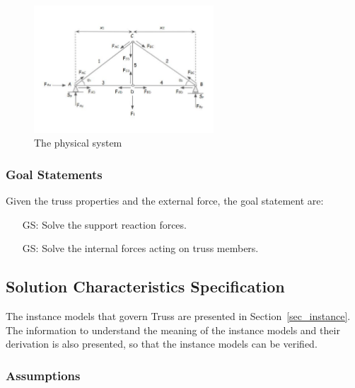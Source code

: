 \documentclass[12pt]{article}
\newcounter{goalnum} %
\begin{document}
\begin{figure}[h!]
	\begin{center}
		\includegraphics[width=0.6\textwidth]{PhysicalSystem}
		\caption{The physical system}
		\label{Fig_PhysicalSystem} 
	\end{center}
\end{figure}

\subsubsection{Goal Statements}\label{sec_goal}

\noindent 
Given the truss properties and the external force, the goal statement are:

\begin{itemize}
\item[GS\refstepcounter{goalnum}\thegoalnum \label{G_solreactforce}:] 
{Solve the support reaction forces.}

\item[GS\refstepcounter{goalnum}\thegoalnum \label{G_solforce}:] 
{Solve the internal forces acting on truss members.}
\end{itemize}

\subsection{Solution Characteristics Specification} \label{Sec_solcharspec}

The instance models that govern Truss are presented in 
Section~\ref{sec_instance}.  The information to understand the meaning of the
instance models and their derivation is also presented, so that the instance
models can be verified.

\subsubsection{Assumptions} \label{sec_assumpt}
\end{document}

